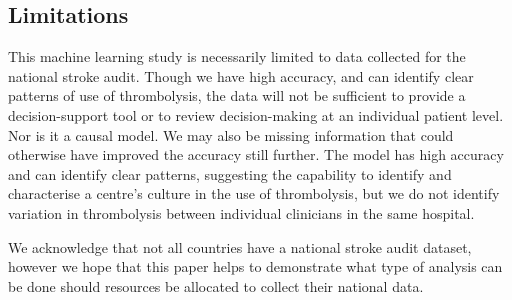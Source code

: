 \subsection{Limitations}

This machine learning study is necessarily limited to data collected for the national stroke audit. Though we have high accuracy, and can identify clear patterns of use of thrombolysis, the data will not be sufficient to provide a decision-support tool or to review decision-making at an individual patient level. Nor is it a causal model. We may also be missing information that could otherwise have improved the accuracy still further. The model has high accuracy and can identify clear patterns, suggesting the capability to identify and characterise a centre's culture in the use of thrombolysis, but we do not identify variation in thrombolysis between individual clinicians in the same hospital.

We acknowledge that not all countries have a national stroke audit dataset, however we hope that this paper helps to demonstrate what type of analysis can be done should resources be allocated to collect their national data.